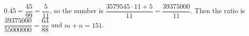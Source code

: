 $0.\overline{45}=\dfrac{45}{99}=\dfrac5{11}$, so the number is $\dfrac{3579545\cdot11+5}{11}=\dfrac{39375000}{11}$. Then the ratio is $\dfrac{39375000}{55000000}=\dfrac{63}{88}$ and $m+n=\boxed{151}$.
